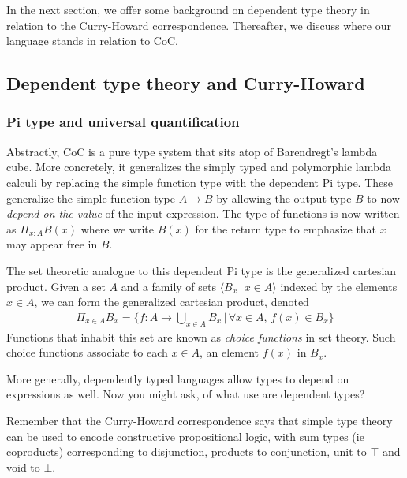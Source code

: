 \documentclass{article}
\begin{document}
In the next section, we offer some background on dependent type theory in 
relation to the Curry-Howard correspondence. Thereafter, we discuss where our
language stands in relation to CoC.

\subsection{Dependent type theory and Curry-Howard}
\subsubsection{Pi type and universal quantification}
Abstractly, CoC is a pure type system that sits atop of Barendregt's
lambda cube.
More concretely, it generalizes the simply typed and polymorphic
lambda calculi by replacing the simple function type with the dependent Pi type.
These generalize the simple function type $A \to B$ by allowing the output type
$B$ to now \textit{depend on the value} of the input expression.
The type of functions is now written as $\Pi_{x : A} B(x)$ where
we write $B(x)$ for the return type to emphasize that $x$ may appear free in
$B$.

The set theoretic analogue to this dependent Pi type is the generalized
cartesian product. Given a set $A$ and a family of sets $\langle B_x \, | \, x
\in A\rangle$ indexed by the
elements $x \in A$, we can form the generalized cartesian product, denoted
\begin{align*}
  \Pi_{x \in A} B_x = \bigg\{ f : A \rightarrow \bigcup_{x \in A} B_x \, | \, \forall x \in A, \, f(x) \in B_x \bigg\}
\end{align*}
Functions that inhabit this set are known as \textit{choice functions} in set
theory. Such choice functions associate to each $x \in A$, an element $f(x)$ in $B_x$.

More generally, dependently typed languages allow types to depend on expressions
as well.
Now you might ask, of what use are dependent types?

Remember that the Curry-Howard correspondence says that simple type theory
can be used to encode constructive propositional logic,
with sum types (ie coproducts) corresponding to disjunction, products to 
conjunction, unit to $\top$ and void to $\bot$.
\end{document}
